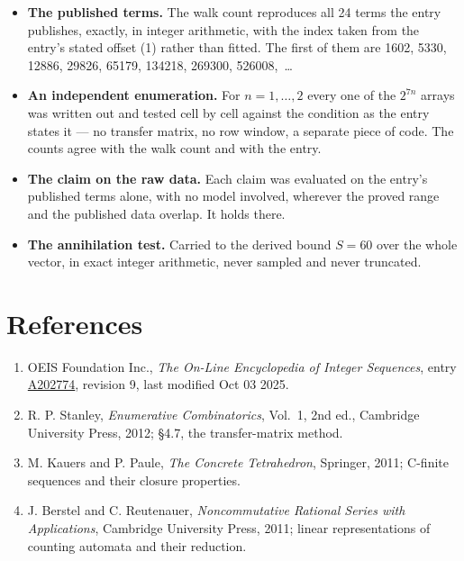 \documentclass[11pt]{article}
\theoremstyle{definition}
\begin{document}
\begin{itemize}

\item {\bfseries The published terms.} The walk count reproduces all 24 terms the entry publishes, exactly, in integer arithmetic, with the index taken from the entry's stated offset (1) rather than fitted. The first of them are 1602, 5330, 12886, 29826, 65179, 134218, 269300, 526008,~\dots

\item {\bfseries An independent enumeration.} For $n = 1,\dots,2$ every one of the $2^{7n}$ arrays was written out and tested cell by cell against the condition as the entry states it --- no transfer matrix, no row window, a separate piece of code. The counts agree with the walk count and with the entry.

\item {\bfseries The claim on the raw data.} Each claim was evaluated on the entry's published terms alone, with no model involved, wherever the proved range and the published data overlap. It holds there.

\item {\bfseries The annihilation test.} Carried to the derived bound $S = 60$ over the whole vector, in exact integer arithmetic, never sampled and never truncated.

\end{itemize}

\section{References}

\begin{enumerate}

\item OEIS Foundation Inc., \emph{The On-Line Encyclopedia of Integer Sequences}, entry \href{https://oeis.org/A202774}{A202774}, revision 9, last modified Oct 03 2025.

\item R. P. Stanley, \emph{Enumerative Combinatorics}, Vol.~1, 2nd ed., Cambridge University Press, 2012; \S4.7, the transfer-matrix method.

\item M. Kauers and P. Paule, \emph{The Concrete Tetrahedron}, Springer, 2011; C-finite sequences and their closure properties.

\item J. Berstel and C. Reutenauer, \emph{Noncommutative Rational Series with Applications}, Cambridge University Press, 2011; linear representations of counting automata and their reduction.

\end{enumerate}
\end{document}
